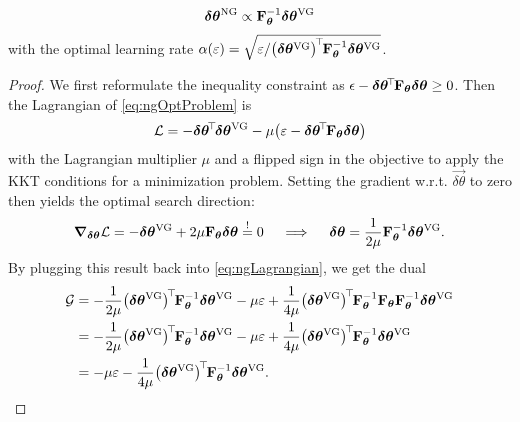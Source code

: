 		\begin{equation}
			\bm{\delta\theta}^\mathrm{NG} \propto \bm{\mathrm{F}}_{\bm{\theta}}^{-1} \bm{\delta\theta}^\mathrm{VG}
		\end{equation}
		with the optimal learning rate \( \alpha(\varepsilon) = \sqrt{\varepsilon / \bigl(\bm{\delta\theta}^\mathrm{VG}\bigr)^{\!\top\!} \bm{\mathrm{F}}_{\bm{\theta}}^{-1} \bm{\delta\theta}^\mathrm{VG}} \).
		\begin{proof}
			We first reformulate the inequality constraint as \( \epsilon - \bm{\delta\theta}^{\!\top\!} \bm{\mathrm{F}}_{\bm{\theta}} \bm{\delta\theta} \geq 0 \). Then the Lagrangian of \eqref{eq:ngOptProblem} is
			\begin{equation}
				\mathcal{L} = -\bm{\delta\theta}^{\!\top\!} \bm{\delta\theta}^\mathrm{VG} - \mu \bigl( \varepsilon - \bm{\delta\theta}^{\!\top\!} \bm{\mathrm{F}}_{\bm{\theta}} \bm{\delta\theta} \bigr)
				\label{eq:ngLagrangian}
			\end{equation}
			with the Lagrangian multiplier \(\mu\) and a flipped sign in the objective to apply the \ac{KKT} conditions for a minimization problem. Setting the gradient w.r.t. \( \vec{\delta\theta} \) to zero then yields the optimal search direction:
			\begin{equation}
				\grad_{\bm{\delta\theta}} \mathcal{L} = -\bm{\delta\theta}^\mathrm{VG} + 2 \mu \bm{\mathrm{F}}_{\bm{\theta}} \bm{\delta\theta} \overset{!}{=} 0
				\quad\implies\quad
				\bm{\delta\theta} = \frac{1}{2 \mu} \bm{\mathrm{F}}_{\bm{\theta}}^{-1} \bm{\delta\theta}^\mathrm{VG}.
				\label{eq:ngPrimal}
			\end{equation}
			By plugging this result back into \eqref{eq:ngLagrangian}, we get the dual
			\begin{align}
				\mathcal{G}
				 & = -\frac{1}{2 \mu} \bigl(\vec{\delta\theta}^\mathrm{VG}\bigr)^\transposed \mat{F}_{\vec{\theta}}^{-1} \vec{\delta\theta}^\mathrm{VG} - \mu \varepsilon + \frac{1}{4 \mu} \bigl(\vec{\delta\theta}^\mathrm{VG}\bigr)^\transposed \mat{F}_{\vec{\theta}}^{-1} \mat{F}_{\vec{\theta}} \mat{F}_{\vec{\theta}}^{-1} \vec{\delta\theta}^\mathrm{VG} \\
				 & = -\frac{1}{2 \mu} \bigl(\vec{\delta\theta}^\mathrm{VG}\bigr)^\transposed \mat{F}_{\vec{\theta}}^{-1} \vec{\delta\theta}^\mathrm{VG} - \mu \varepsilon + \frac{1}{4 \mu} \bigl(\vec{\delta\theta}^\mathrm{VG}\bigr)^\transposed \mat{F}_{\vec{\theta}}^{-1} \vec{\delta\theta}^\mathrm{VG}                                                    \\
				 & = -\mu \varepsilon - \frac{1}{4 \mu} \bigl(\vec{\delta\theta}^\mathrm{VG}\bigr)^\transposed \mat{F}_{\vec{\theta}}^{-1} \vec{\delta\theta}^\mathrm{VG}.

\end{align}
\end{proof}
